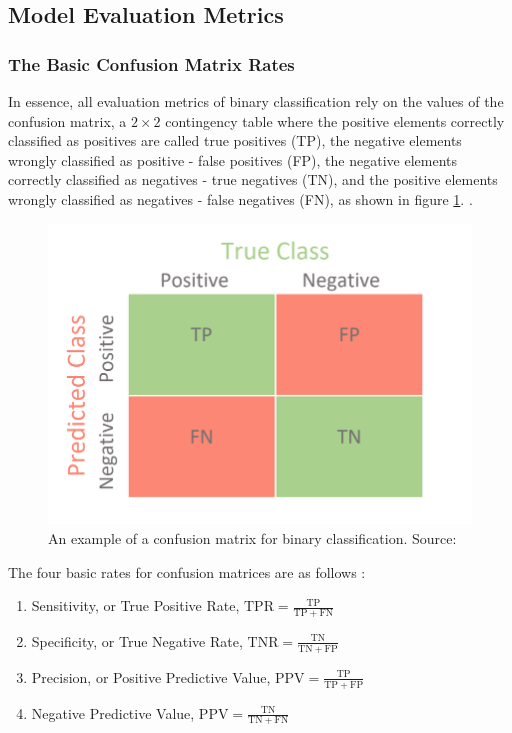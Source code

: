 \subsection{Model Evaluation Metrics}

\subsubsection{The Basic Confusion Matrix Rates}
In essence, all evaluation metrics of binary classification rely on the values of the confusion matrix, a $2 \times 2$ contingency table where the positive elements correctly classified as positives are called true positives (TP), the negative elements wrongly classified as positive - false positives (FP), the negative elements correctly classified as negatives - true negatives (TN), and the positive elements wrongly classified as negatives - false negatives (FN), as shown in figure \ref{fig:conf_matrix}. \cite{chicco_eval_2023}. 

\begin{figure}
    \centering
    \includegraphics[width=0.5\linewidth]{images/conf_matrix.png}
    \caption{An example of a confusion matrix for binary classification. Source: \cite{conf_matrix}}
    \label{fig:conf_matrix}
\end{figure}

The four basic rates for confusion matrices are as follows \cite{chicco_eval_2023}:
\begin{enumerate}
    \item Sensitivity, or True Positive Rate, $\mathrm{TPR}=\frac{\mathrm{TP}}{\mathrm{TP}+\mathrm{FN}}$

    \item Specificity, or True Negative Rate, $\mathrm{TNR}=\frac{\mathrm{TN}}{\mathrm{TN}+\mathrm{FP}}$
    
    \item Precision, or Positive Predictive Value, $\mathrm{PPV}=\frac{\mathrm{TP}}{\mathrm{TP}+\mathrm{FP}}$
    
    \item Negative Predictive Value, $\mathrm{PPV}=\frac{\mathrm{TN}}{\mathrm{TN}+\mathrm{FN}}$
\end{enumerate} 

